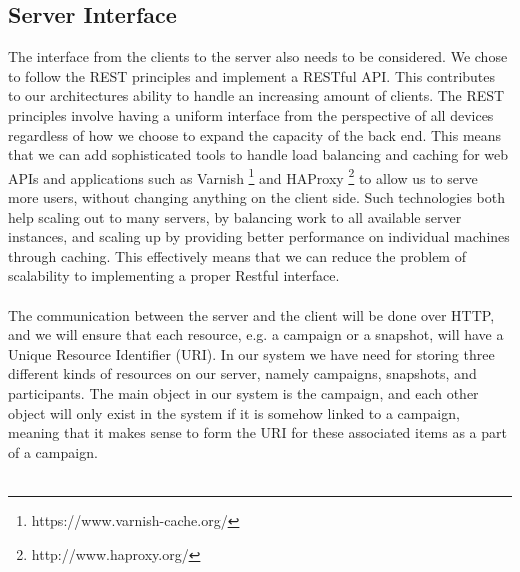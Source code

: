 \subsection{Server Interface}
\label{sub:server_interface}
The interface from the clients to the server also needs to be considered. We chose to follow the REST principles  and implement a RESTful API. This contributes to our architectures ability to handle an increasing amount of clients. The REST principles involve having a uniform interface from the perspective of all devices regardless of how we choose to expand the capacity of the back end. This means that we can add sophisticated tools to handle load balancing and caching for web APIs and applications such as Varnish \footnote{https://www.varnish-cache.org/} and HAProxy \footnote{http://www.haproxy.org/} to allow us to serve more users, without changing anything on the client side. Such technologies both help scaling out to many servers, by balancing work to all available server instances, and scaling up by providing better performance on individual machines through caching. This effectively means that we can reduce the problem of scalability to implementing a proper Restful interface. 
\\\\
The communication between the server and the client will be done over HTTP, and we will ensure that each resource, e.g. a campaign or a snapshot, will have a Unique Resource Identifier (URI). In our system we have need for storing three different kinds of resources on our server, namely campaigns, snapshots, and participants. The main object in our system is the campaign, and each other object will only exist in the system if it is somehow linked to a campaign, meaning that it makes sense to form the URI for these associated items as a part of a campaign. 
\\\\
